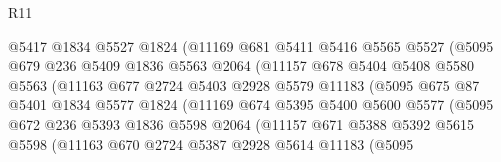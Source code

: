 \begin{lexlean}{R11}
\begin{coremodule}
                          @5417
                          @1834
                          @5527
                          @1824
                          (@11169
                            @681
                            @5411
                            @5416
                            @5565
                            @5527
                            (@5095
                              @679
                              @236
                              @5409
                              @1836
                              @5563
                              @2064
                              (@11157
                                @678
                                @5404
                                @5408
                                @5580
                                @5563
                                (@11163
                                  @677
                                  @2724
                                  @5403
                                  @2928
                                  @5579
                                  @11183
                                  (@5095
                                    @675
                                    @87
                                    @5401
                                    @1834
                                    @5577
                                    @1824
                                    (@11169
                                      @674
                                      @5395
                                      @5400
                                      @5600
                                      @5577
                                      (@5095
                                        @672
                                        @236
                                        @5393
                                        @1836
                                        @5598
                                        @2064
                                        (@11157
                                          @671
                                          @5388
                                          @5392
                                          @5615
                                          @5598
                                          (@11163
                                            @670
                                            @2724
                                            @5387
                                            @2928
                                            @5614
                                            @11183
                                            (@5095

\end{coremodule}
\end{lexlean}
